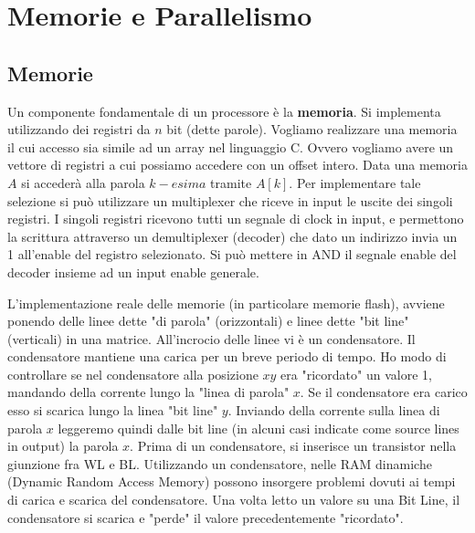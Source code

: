 \chapter{Memorie e Parallelismo}

\section{Memorie}
Un componente fondamentale di un processore è la \textbf{memoria}. Si implementa utilizzando dei registri da $ n $ bit (dette parole). Vogliamo realizzare una memoria il cui accesso sia simile ad un array nel linguaggio C. Ovvero vogliamo avere un vettore di registri a cui possiamo accedere con un offset intero. Data una memoria $ A $ si accederà alla parola $ k-esima $ tramite $ A[k] $. Per implementare tale selezione si può utilizzare un multiplexer che riceve in input le uscite dei singoli registri. I singoli registri ricevono tutti un segnale di clock in input, e permettono la scrittura attraverso un demultiplexer (decoder) che dato un indirizzo invia un 1 all'enable del registro selezionato. Si può mettere in AND il segnale enable del decoder insieme ad un input enable generale.

L'implementazione reale delle memorie (in particolare memorie flash), avviene ponendo delle linee dette "di parola" (orizzontali) e linee dette "bit line" (verticali) in una matrice.
All'incrocio delle linee vi è un condensatore. Il condensatore mantiene una carica per un breve periodo di tempo. Ho modo di controllare se nel condensatore alla posizione $ xy $ era "ricordato" un valore 1, mandando della corrente lungo la "linea di parola" $ x $. Se il condensatore era carico esso si scarica lungo la linea "bit line" $ y $. Inviando della corrente sulla linea di parola $ x $ leggeremo quindi dalle bit line (in alcuni casi indicate come source lines in output) la parola $ x $.
Prima di un condensatore, si inserisce un transistor nella giunzione fra WL e BL. Utilizzando un condensatore, nelle RAM dinamiche (Dynamic Random Access Memory) possono insorgere problemi dovuti ai tempi di carica e scarica del condensatore. Una volta letto un valore su una Bit Line, il condensatore si scarica e "perde" il valore precedentemente "ricordato".



